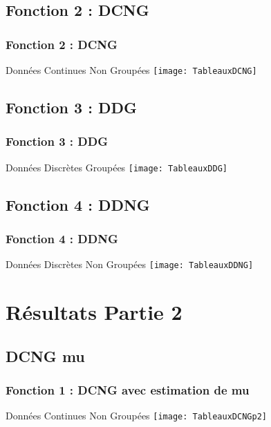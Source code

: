\documentclass{beamer}
\begin{document}
\subsection{Fonction 2 : DCNG}
\begin{frame}[label=Fonction 2 : DCNG]
\frametitle{Fonction 2 : DCNG}
\begin{beamerboxesrounded}[shadow=true]{Données Continues Non Groupées}
	\texttt{[image: TableauxDCNG]}\\
\end{beamerboxesrounded}
\end{frame}


\subsection{Fonction 3 : DDG}
\begin{frame}[label=Fonction 3 : DDG]
\frametitle{Fonction 3 : DDG}
\begin{beamerboxesrounded}[shadow=true]{Données Discrètes Groupées}
			\texttt{[image: TableauxDDG]}\\
\end{beamerboxesrounded}
\end{frame}


\subsection{Fonction 4 : DDNG}
\begin{frame}[label=Fonction 4 : DDNG]
\frametitle{Fonction 4 : DDNG}
\begin{beamerboxesrounded}[shadow=true]{Données Discrètes Non Groupées}
	\texttt{[image: TableauxDDNG]}\\
\end{beamerboxesrounded}
\end{frame}


\section{Résultats Partie 2}

\subsection{DCNG mu}
\begin{frame}[label=Fonction 1 : DCNG avec estimation de mu]
\frametitle{Fonction 1 : DCNG avec estimation de mu}
\begin{beamerboxesrounded}[shadow=true]{Données Continues Non Groupées}
\texttt{[image: TableauxDCNGp2]}\\
\end{beamerboxesrounded}
\end{frame}
\end{document}
